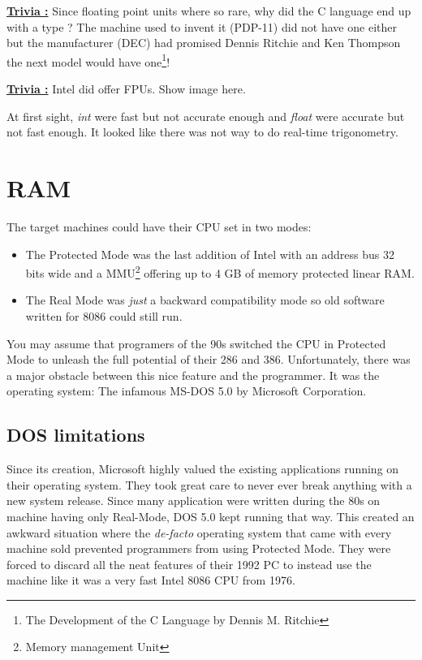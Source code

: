 \documentclass[book.tex]{subfiles}
\begin{document}
  \bigskip

 \textbf{\underline{Trivia :}} Since floating point units where so rare, why did the C language end up with a  type ? The machine used to invent it (PDP-11) did not have one either but the manufacturer (DEC) had promised Dennis Ritchie and Ken Thompson the next model would have one\footnote{The Development of the C Language by Dennis M. Ritchie}!

\bigskip  

\textbf{\underline{Trivia :}} Intel did offer FPUs. Show image here.

At first sight, \emph{int} were fast but not accurate enough and \emph{float} were accurate but not fast enough. It looked like there was not way to do real-time trigonometry.

   















\section{RAM}
The target machines could have their CPU set in two modes:
\begin{itemize}
  \item The Protected Mode was the last addition of Intel with an address bus 32 bits wide and a MMU\footnote{Memory management Unit} offering up to 4 GB of memory protected linear RAM.
  \item The Real Mode was \emph{just} a backward compatibility mode so old software written for 8086 could still run. 
\end{itemize}
  You may assume that programers of the 90s switched the CPU in Protected Mode to unleash the full potential of their 286 and 386. Unfortunately, there was a major obstacle between this nice feature and the programmer. It was the operating system: The infamous MS-DOS 5.0 by Microsoft Corporation.
  






  \subsection{DOS limitations}
  Since its creation, Microsoft highly valued the existing applications running on their operating system. They took great care to never ever break anything with a new system release.  Since many application were written during the 80s on machine having only Real-Mode, DOS 5.0 kept running that way. This created an awkward situation where the \emph{de-facto} operating system that came with every machine sold prevented programmers from using Protected Mode. They were forced to discard all the neat features of their 1992 PC to instead use the machine like it was a very fast Intel 8086 CPU from 1976.
\end{document}
